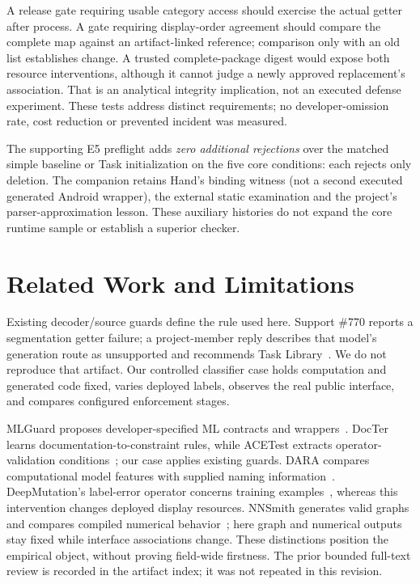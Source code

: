 \documentclass[10pt,conference]{IEEEtran}
\begin{document}
A release gate requiring usable category access should exercise the actual getter after process. A gate requiring display-order agreement should compare the complete map against an artifact-linked reference; comparison only with an old list establishes change. A trusted complete-package digest would expose both resource interventions, although it cannot judge a newly approved replacement's association. That is an analytical integrity implication, not an executed defense experiment. These tests address distinct requirements; no developer-omission rate, cost reduction or prevented incident was measured.

The supporting E5 preflight adds \emph{zero additional rejections} over the matched simple baseline or Task initialization on the five core conditions: each rejects only deletion. The companion retains Hand's binding witness (not a second executed generated Android wrapper), the external static examination and the project's parser-approximation lesson. These auxiliary histories do not expand the core runtime sample or establish a superior checker.

\section{Related Work and Limitations}
\label{sec:related}
Existing decoder/source guards define the rule used here. Support \#770 reports a segmentation getter failure; a project-member reply describes that model's generation route as unsupported and recommends Task Library~\cite{support770,support770reply}. We do not reproduce that artifact. Our controlled classifier case holds computation and generated code fixed, varies deployed labels, observes the real public interface, and compares configured enforcement stages.

MLGuard proposes developer-specified ML contracts and wrappers~\cite{mlguard}. DocTer learns documentation-to-constraint rules, while ACETest extracts operator-validation conditions~\cite{docter,acetest}; our case applies existing guards. DARA compares computational model features with supplied naming information~\cite{dara}. DeepMutation's label-error operator concerns training examples~\cite{deepmutation}, whereas this intervention changes deployed display resources. NNSmith generates valid graphs and compares compiled numerical behavior~\cite{nnsmith}; here graph and numerical outputs stay fixed while interface associations change. These distinctions position the empirical object, without proving field-wide firstness. The prior bounded full-text review is recorded in the artifact index; it was not repeated in this revision.
\end{document}

